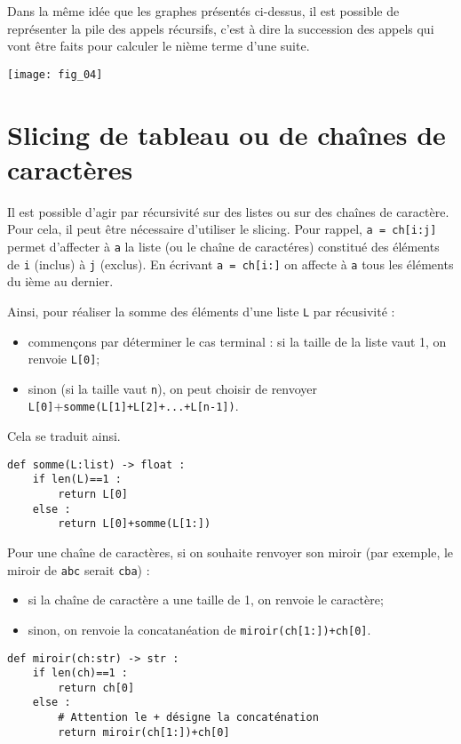 Dans la même idée que les graphes présentés ci-dessus, il est possible de représenter la pile des appels récursifs, c'est à dire la succession des appels qui vont être faits pour calculer le nième terme d'une suite. 

\begin{center}
\texttt{[image: fig\_04]}
\end{center}

\section{Slicing de tableau ou de chaînes de caractères}
Il est possible d'agir par récursivité sur des listes ou sur des chaînes de caractère. Pour cela, il peut être nécessaire d'utiliser le slicing. Pour rappel, \texttt{a = ch[i:j]} permet d'affecter à \texttt{a} la liste (ou le chaîne de caractéres) constitué des éléments de \texttt{i} (inclus) à \texttt{j} (exclus). En écrivant \texttt{a = ch[i:]} on affecte à \texttt{a} tous les éléments du ième au dernier.


\vspace{.5cm}

\noindent\begin{minipage}[c]{.45\linewidth}

Ainsi, pour réaliser la somme des éléments d'une liste \texttt{L} par récusivité : 
\begin{itemize}
\item commençons par déterminer le cas terminal : si la taille de la liste vaut 1, on renvoie \texttt{L[0]};
\item sinon (si la taille vaut \texttt{n}), on peut choisir de renvoyer \texttt{L[0]}+\texttt{somme(L[1]+L[2]+...+L[n-1])}. 
\end{itemize}
Cela se traduit ainsi.
\begin{lstlisting}
def somme(L:list) -> float :
    if len(L)==1 : 
        return L[0]
    else :
        return L[0]+somme(L[1:])
\end{lstlisting}
\end{minipage} \hfill
\begin{minipage}[c]{.53\linewidth}
Pour une chaîne de caractères, si on souhaite renvoyer son miroir (par exemple, le miroir de \texttt{abc} serait \texttt{cba}) : 
\begin{itemize}
\item si la chaîne de caractère a une taille de 1, on renvoie le caractère;
\item sinon, on renvoie la concatanéation de  \texttt{miroir(ch[1:])+ch[0]}.
\end{itemize}
\begin{lstlisting}
def miroir(ch:str) -> str :
    if len(ch)==1 : 
        return ch[0]
    else :
        # Attention le + désigne la concaténation
        return miroir(ch[1:])+ch[0]
 \end{lstlisting}  
\end{minipage} 

